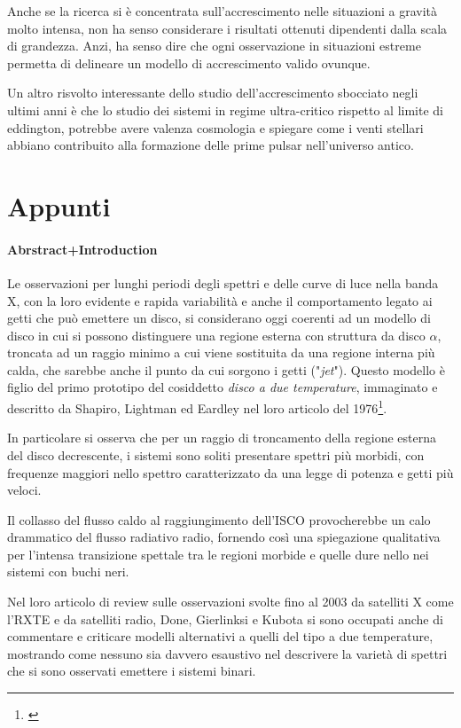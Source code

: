 \documentclass[a4paperbi]{article}
\begin{document}
	Anche se la ricerca si è concentrata sull'accrescimento nelle situazioni a gravità molto intensa, non ha senso considerare i risultati ottenuti dipendenti dalla scala di grandezza. Anzi, ha senso dire che ogni osservazione in situazioni estreme permetta di delineare un modello di accrescimento valido ovunque.
	
	Un altro risvolto interessante dello studio dell'accrescimento sbocciato negli ultimi anni è che lo studio dei sistemi in regime ultra-critico rispetto al limite di eddington, potrebbe avere valenza cosmologia e spiegare come i venti stellari abbiano contribuito alla formazione delle prime pulsar nell'universo antico.
\newpage
\section{Appunti}
	\paragraph{Abrstract+Introduction}
	Le osservazioni per lunghi periodi degli spettri e delle curve di luce nella banda X, con la loro evidente e rapida variabilità e anche il comportamento legato ai getti che può emettere un disco, si considerano oggi coerenti ad un modello di disco in cui si possono distinguere una regione esterna con struttura da disco $\alpha$, troncata ad un raggio minimo a cui viene sostituita da una regione interna più calda, che sarebbe anche il punto da cui sorgono i getti ("\textit{jet}"). Questo modello è figlio del primo prototipo del cosiddetto \textit{disco a due temperature}, immaginato e descritto da Shapiro, Lightman ed Eardley nel loro articolo del 1976\footnote{\cite{ShapiroLightmanEardley1976}}.
	
	In particolare si osserva che per un raggio di troncamento della regione esterna del disco decrescente, i sistemi sono soliti presentare spettri più morbidi, con frequenze maggiori nello spettro caratterizzato da una legge di potenza e getti più veloci.
	
	Il collasso del flusso caldo al raggiungimento dell'ISCO provocherebbe un calo drammatico del flusso radiativo radio, fornendo così una spiegazione qualitativa per l'intensa transizione spettale tra le regioni morbide e quelle dure nello nei sistemi con buchi neri.
	
	Nel loro articolo di review sulle osservazioni svolte fino al 2003 da satelliti X come l'RXTE e da satelliti radio, Done, Gierlinksi e Kubota si sono occupati anche di commentare e criticare modelli alternativi a quelli del tipo a due temperature, mostrando come nessuno sia davvero esaustivo nel descrivere la varietà di spettri che si sono osservati emettere i sistemi binari.
	
\end{document}
